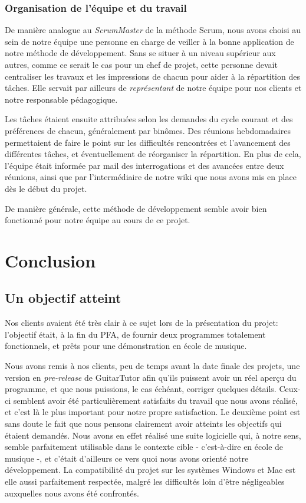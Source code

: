 \documentclass[a4paper,11pt]{article}
\begin{document}
\subsubsection{Organisation de l'équipe et du travail}

De manière analogue au \textit{ScrumMaster} de la méthode Scrum, nous avons choisi au sein de notre équipe une personne en charge de veiller à la bonne application de notre méthode de développement. Sans se situer à un niveau supérieur aux autres, comme ce serait le cas pour un chef de projet, cette personne devait centraliser les travaux et les impressions de chacun pour aider à la répartition des tâches. Elle servait par ailleurs de \textit{représentant} de notre équipe pour nos clients et notre responsable pédagogique.

Les tâches étaient ensuite attribuées selon les demandes du cycle courant et des préférences de chacun, généralement par binômes. Des réunions hebdomadaires permettaient de faire le point sur les difficultés rencontrées et l'avancement des différentes tâches, et éventuellement de réorganiser la répartition. En plus de cela, l'équipe était informée par mail des interrogations et des avancées entre deux réunions, ainsi que par l'intermédiaire de notre wiki que nous avons mis en place dès le début du projet.

De manière générale, cette méthode de développement semble avoir bien fonctionné pour notre équipe au cours de ce projet.

\clearpage

\section*{Conclusion}

\subsection*{Un objectif atteint}

Nos clients avaient été très clair à ce sujet lors de la présentation du projet: l'objectif était, à la fin du PFA, de fournir deux programmes totalement fonctionnels, et prêts pour une démonstration en école de musique.

Nous avons remis à nos clients, peu de temps avant la date finale des projets, une version en \textit{pre-release} de GuitarTutor afin qu'ils puissent avoir un réel aperçu du programme, et que nous puissions, le cas échéant, corriger quelques détails. Ceux-ci semblent avoir été particulièrement satisfaits du travail que nous avons réalisé, et c'est là le plus important pour notre propre satisfaction. Le deuxième point est sans doute le fait que nous pensons clairement avoir atteints les objectifs qui étaient demandés. Nous avons en effet réalisé une suite logicielle qui, à notre sens, semble parfaitement utilisable dans le contexte cible - c'est-à-dire en école de musique -, et c'était d'ailleurs ce vers quoi nous avons orienté notre développement. La compatibilité du projet sur les systèmes Windows et Mac est elle aussi parfaitement respectée, malgré les difficultés loin d'être négligeables auxquelles nous avons été confrontés.
\end{document}
